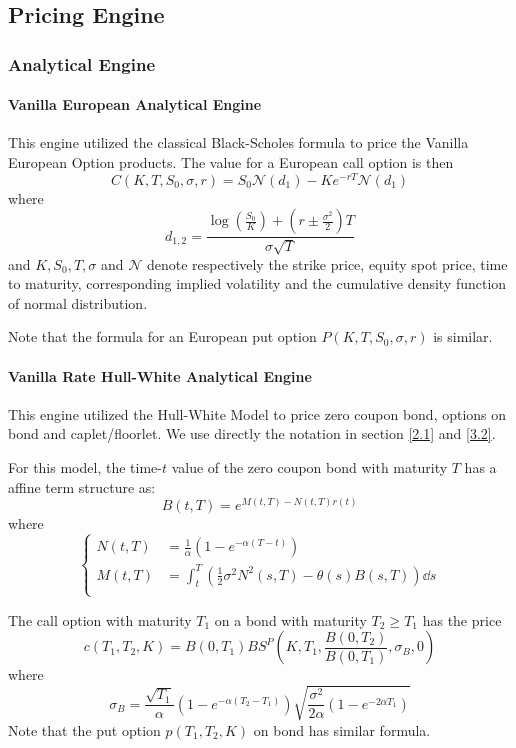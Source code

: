 \documentclass[11pt]{article}
\numberwithin{equation}{section}
\theoremstyle{remark}
\begin{document}
\subsection{Pricing Engine}\label{4.4}

\subsubsection{Analytical Engine}\label{4.4.1}
\paragraph{Vanilla European Analytical Engine}
This engine utilized the classical Black-Scholes formula to price the Vanilla European Option products. The value for a European call option is then
$$C(K, T, S_0, \sigma, r) = S_0 \mathcal{N}(d_1) - Ke^{-rT}\mathcal{N}(d_1)$$
where
$$d_{1,2} = \frac{\log \left( \frac{S_0}{K} \right) + \left(r\pm\frac{\sigma^2}{2} \right)T}{\sigma\sqrt{T}}$$
and $K, S_0, T, \sigma $ and $\mathcal{N}$ denote respectively the strike price, equity spot price, time to maturity, corresponding implied volatility and the cumulative density function of normal distribution.

Note that the formula for an European put option $P(K, T, S_0, \sigma, r)$ is similar.

\paragraph{Vanilla Rate Hull-White Analytical Engine}
This engine utilized the Hull-White Model to price zero coupon bond, options on bond and caplet/floorlet. We use directly the notation in section \ref{2.1} and \ref{3.2}.

For this model, the time-$t$ value of the zero coupon bond with maturity $T$ has a affine term structure as:
$$B(t,T) = e^{M(t,T) - N(t,T)r(t)}$$
where
$$
\left\{
\begin{array}{ll}
  N(t,T) &= \frac{1}{\alpha} \left(1-e^{-\alpha(T-t)} \right)\\
  M(t,T) &= \int_t^T \left( \frac{1}{2}\sigma^2 N^2(s,T)-\theta(s)B(s,T) \right) \dd s\\
\end{array}
\right.
$$

The call option with maturity $T_1$ on a bond with maturity $T_2 \geq T_1$ has the price
$$c(T_1, T_2, K) = B(0, T_1) BS^P \left(K, T_1, \frac{B(0, T_2)}{B(0, T_1)}, \sigma_B, 0 \right)$$
where
$$\sigma_B = \frac{\sqrt{T_1}}{\alpha}\left(1-e^{-\alpha(T_2-T_1)}\right)\sqrt{\frac{\sigma^2}{2\alpha}(1-e^{-2\alpha T_1})}$$
Note that the put option $p(T_1, T_2, K)$ on bond has similar formula.
\end{document}
